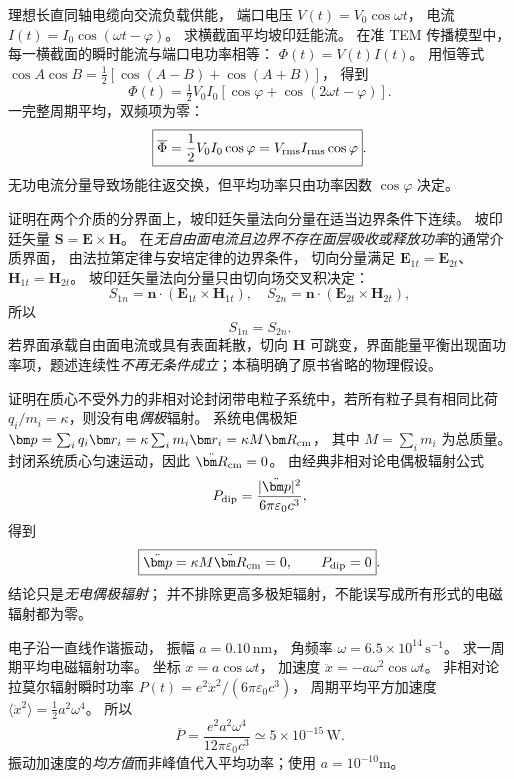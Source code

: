 理想长直同轴电缆向交流负载供能，
端口电压
$V(t)=V_0\cos\omega t$，
电流
$I(t)=I_0\cos(\omega t-\varphi)$。
求横截面平均坡印廷能流。
\exsolution
在准 TEM 传播模型中，
每一横截面的瞬时能流与端口电功率相等：
$\Phi(t)=V(t)I(t)$。
用恒等式
$\cos A\cos B=\tfrac12[\cos(A-B)+\cos(A+B)]$，
得到
\[
\Phi(t)=\tfrac12V_0I_0
[\cos\varphi+\cos(2\omega t-\varphi)].
\]
一完整周期平均，双频项为零：
\[
\boxed{\overline\Phi=
\frac12V_0I_0\cos\varphi
=V_{\rm rms}I_{\rm rms}\cos\varphi}.
\]
\excheck 无功电流分量导致场能往返交换，但平均功率只由功率因数 $\cos\varphi$ 决定。

证明在两个介质的分界面上，坡印廷矢量法向分量在适当边界条件下连续。
\exsolution
坡印廷矢量 $\bm S=\bm E\times\bm H$。
在\emph{无自由面电流且边界不存在面层吸收或释放功率}的通常介质界面，
由法拉第定律与安培定律的边界条件，
切向分量满足
$\bm E_{1t}=\bm E_{2t}$、
$\bm H_{1t}=\bm H_{2t}$。
坡印廷矢量法向分量只由切向场交叉积决定：
\[
S_{1n}=\bm n\cdot(\bm E_{1t}\times\bm H_{1t}),
\quad
S_{2n}=\bm n\cdot(\bm E_{2t}\times\bm H_{2t}),
\]
所以
\[
\boxed{S_{1n}=S_{2n}}.
\]
\excheck 若界面承载自由面电流或具有表面耗散，切向 $\bm H$ 可跳变，界面能量平衡出现面功率项，题述连续性\emph{不再无条件成立}；本稿明确了原书省略的物理假设。

证明在质心不受外力的非相对论封闭带电粒子系统中，若所有粒子具有相同比荷 $q_i/m_i=\kappa$，则没有电\emph{偶极}辐射。
\exsolution
系统电偶极矩
$\bm p=\sum_iq_i\bm r_i
=\kappa\sum_im_i\bm r_i
=\kappa M\bm R_{\rm cm}$，
其中 $M=\sum_i m_i$ 为总质量。
封闭系统质心匀速运动，因此
$\ddot{\bm R}_{\rm cm}=0$。
由经典非相对论电偶极辐射公式
\[
P_{\rm dip}=
\frac{|\ddot{\bm p}|^2}{6\pi\varepsilon_0c^3},
\]
得到
\[
\boxed{\ddot{\bm p}=\kappa M\ddot{\bm R}_{\rm cm}=0,
\qquad P_{\rm dip}=0}.
\]
\excheck 结论只是\emph{无电偶极辐射}；
并不排除更高多极矩辐射，不能误写成所有形式的电磁辐射都为零。

电子沿一直线作谐振动，
振幅 $a=0.10\,\mathrm{nm}$，
角频率 $\omega=6.5\times10^{14}\,\mathrm{s^{-1}}$。
求一周期平均电磁辐射功率。
\exsolution
坐标 $x=a\cos\omega t$，
加速度
$\ddot x=-a\omega^2\cos\omega t$。
非相对论拉莫尔辐射瞬时功率
$P(t)=e^2\ddot x^2/(6\pi\varepsilon_0c^3)$，
周期平均平方加速度
$\langle\ddot x^2\rangle=\tfrac12a^2\omega^4$。
所以
\[
\boxed{\overline P=
\frac{e^2a^2\omega^4}{12\pi\varepsilon_0c^3}
\simeq5\times10^{-15}\,\mathrm W}.
\]
\excheck 振动加速度的\emph{均方值}而非峰值代入平均功率；使用 $a=10^{-10}$m。
